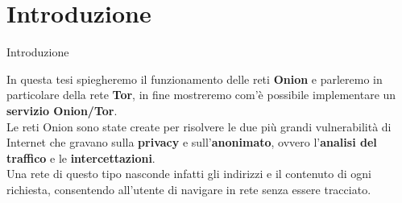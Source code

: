 \section{Introduzione}
\begin{frame}{Introduzione}

    \centering
    In questa tesi spiegheremo il funzionamento delle reti \textbf{Onion} e parleremo in particolare della rete \textbf{Tor}, in fine mostreremo com'è possibile implementare un \textbf{servizio Onion/Tor}. \\
    Le reti Onion sono state create per risolvere le due più grandi vulnerabilità di Internet che gravano sulla \textbf{privacy} e sull'\textbf{anonimato}, ovvero l'\textbf{analisi del traffico} e le \textbf{intercettazioni}. \\
    Una rete di questo tipo nasconde infatti gli indirizzi e il contenuto di ogni richiesta, consentendo all'utente di navigare in rete senza essere tracciato.

\end{frame}